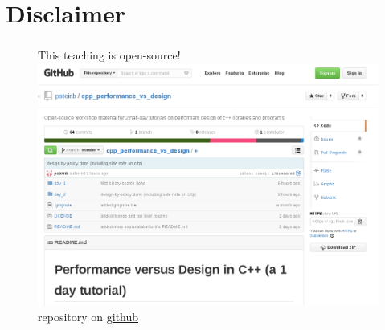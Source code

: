 \documentclass[9pt,xcolor=table]{beamer}
\begin{document}


\section*{Disclaimer}
\begin{frame}
\frametitle{\insertsection{}}
\begin{figure}[htb]\Large
  This teaching is open-source!\\
  \includegraphics[width=.7\textwidth]{img/all_on_github}\\[6pt]\small
  repository on \href{https://github.com/psteinb/cpp_performance_vs_design}{github}
\end{figure}
\end{frame}
\end{document}

